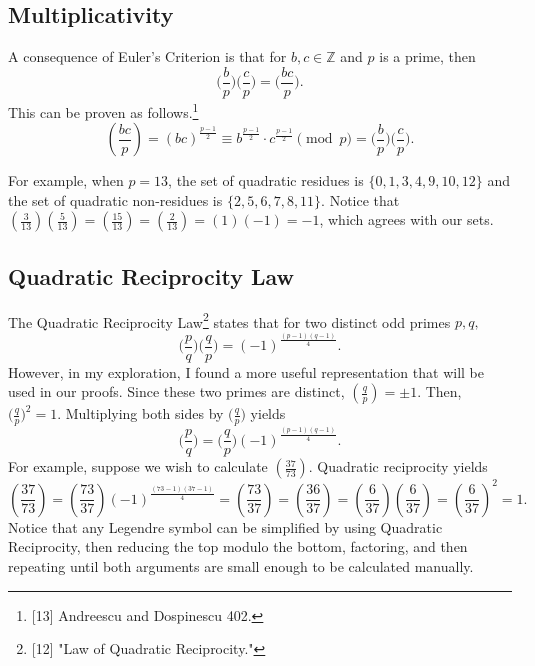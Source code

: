 \documentclass{article}
\newcommand{\Z}{\mathbb{Z}}
\newcommand{\p}{\varphi}
\newcommand{\qrbg}[2]{\bigg( \frac{#1}{#2}\bigg)}
\newcommand{\qrn}[2]{\left( \frac{#1}{#2}\right)}
\begin{document}

\subsection{Multiplicativity}
A consequence of Euler's Criterion is that for $b,c\in\Z$ and $p$ is a prime, then \[\qrbg{b}{p}\qrbg{c}{p} = \qrbg{bc}{p}.\]
This can be proven as follows.\footnote{[13] Andreescu and Dospinescu 402.} \[\qrn{bc}{p}=(bc)^{\frac{p-1}{2}} \equiv b^{\frac{p-1}{2}}\cdot c^{\frac{p-1}{2}} \pmod {p} = \qrbg{b}{p}\qrbg{c}{p}.\]

For example, when $p=13$, the set of quadratic residues is $\{0, 1, 3, 4, 9, 10, 12\}$ and the set of quadratic non-residues is $\{2, 5, 6, 7, 8, 11\}$. Notice that $\qrn{3}{13}\qrn{5}{13} = \qrn{15}{13} = \qrn{2}{13} = (1)(-1) = -1$, which agrees with our sets.
\subsection{Quadratic Reciprocity Law}
The Quadratic Reciprocity Law\footnote{[12] "Law of Quadratic Reciprocity."} states that for two distinct odd primes $p, q,$
\[\qrbg{p}{q} \qrbg{q}{p} = (-1)^{\frac{(p-1)(q-1)}{4}}.\]
However, in my exploration, I found a more useful representation that will be used in our proofs. Since these two primes are distinct, $\qrn{q}{p} = \pm 1$. Then, $\big(\frac{q}{p}\big)^2=1$. Multiplying both sides by $\big(\frac{q}{p}\big)$ yields
\[\tag{Quadratic Reciprocity}\qrbg{p}{q} = \qrbg{q}{p}(-1)^{\frac{(p-1)(q-1)}{4}}.\]
For example, suppose we wish to calculate $\qrn{37}{73}$. Quadratic reciprocity yields
\[\qrn{37}{73} = \qrn{73}{37}(-1)^{\frac{(73-1)(37-1)}{4}}=\qrn{73}{37}=\qrn{36}{37}=\qrn{6}{37}\qrn{6}{37}=\qrn{6}{37}^2 = 1.\]
Notice that any Legendre symbol can be simplified by using Quadratic Reciprocity, then reducing the top  modulo the bottom, factoring, and then repeating until both arguments are small enough to be calculated manually.
\newpage
\end{document}
